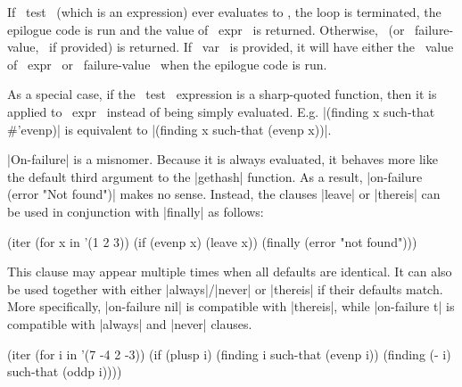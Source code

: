 \begin{clauses}

If ~test~ (which is an expression) ever evaluates to \nonnil, the loop
is terminated, the 
epilogue code is run and the value of ~expr~ is returned.  Otherwise,
\nil\ (or ~failure-value,~ if provided) is returned.  If ~var~ is
provided, it will have either the \nonnil\ value of ~expr~ or
~failure-value~ when the epilogue code is run.

\cpar As a special case, if the ~test~ expression is a sharp-quoted
function, then it is applied to ~expr~ instead of being simply
evaluated.  E.g. |(finding x such-that \#'evenp)| is equivalent to
|(finding x such-that (evenp x))|.  


\cpar |On-failure| is a misnomer. Because it is always evaluated, it behaves
more like the default third argument to the |gethash| function. As a result,
|on-failure (error "Not found")| makes no sense. Instead, the clauses |leave|
or |thereis| can be used in conjunction with |finally| as follows:
\begin{program}
(iter (for x in '(1 2 3))
      (if (evenp x) (leave x))
      (finally (error "not found")))
\end{program}

\cpar This clause may appear multiple times when all defaults are
identical. It can also be used together with either |always|/|never| or
|thereis| if their defaults match. More specifically, |on-failure nil| is
compatible with |thereis|, while |on-failure t| is compatible with |always|
and |never| clauses.
\begin{program}
(iter (for i in '(7 -4 2 -3))
      (if (plusp i)
	  (finding    i  such-that (evenp i))
          (finding (- i) such-that (oddp i))))
\end{program}


\end{clauses}
